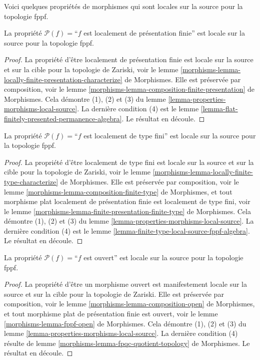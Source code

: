 \noindent
Voici quelques propriétés de morphismes qui sont locales sur la source pour la
topologie fppf.

\begin{lemma}
\label{lemma-locally-finite-presentation-fppf-local-source}
La propriété $\mathcal{P}(f)=$``$f$ est localement de présentation finie''
est locale sur la source pour la topologie fppf.
\end{lemma}

\begin{proof}
La propriété d'être localement de présentation finie est locale sur la source
et sur la cible pour la topologie de Zariski, voir le
lemme \ref{morphisms-lemma-locally-finite-presentation-characterize} de Morphismes.
Elle est préservée par composition, voir
le lemme \ref{morphisms-lemma-composition-finite-presentation} de Morphismes.
Cela démontre (1), (2) et (3) du
lemme \ref{lemma-properties-morphisms-local-source}.
La dernière condition (4) est le
lemme \ref{lemma-flat-finitely-presented-permanence-algebra}.
Le résultat en découle.
\end{proof}

\begin{lemma}
\label{lemma-locally-finite-type-fppf-local-source}
La propriété $\mathcal{P}(f)=$``$f$ est localement de type fini''
est locale sur la source pour la topologie fppf.
\end{lemma}

\begin{proof}
La propriété d'être localement de type fini est locale sur la source et sur la
cible pour la topologie de Zariski, voir le
lemme \ref{morphisms-lemma-locally-finite-type-characterize} de Morphismes.
Elle est préservée par composition, voir
le lemme \ref{morphisms-lemma-composition-finite-type} de Morphismes,
et tout morphisme plat localement de présentation finie est localement de type
fini, voir
le lemme \ref{morphisms-lemma-finite-presentation-finite-type} de Morphismes.
Cela démontre (1), (2) et (3) du
lemme \ref{lemma-properties-morphisms-local-source}.
La dernière condition (4) est le
lemme \ref{lemma-finite-type-local-source-fppf-algebra}.
Le résultat en découle.
\end{proof}

\begin{lemma}
\label{lemma-open-fppf-local-source}
La propriété $\mathcal{P}(f)=$``$f$ est ouvert''
est locale sur la source pour la topologie fppf.
\end{lemma}

\begin{proof}
La propriété d'être un morphisme ouvert est manifestement locale sur la source
et sur la cible pour la topologie de Zariski.
Elle est préservée par composition, voir
le lemme \ref{morphisms-lemma-composition-open} de Morphismes,
et tout morphisme plat de présentation finie est ouvert, voir
le lemme \ref{morphisms-lemma-fppf-open} de Morphismes.
Cela démontre (1), (2) et (3) du
lemme \ref{lemma-properties-morphisms-local-source}.
La dernière condition (4) résulte de
lemme \ref{morphisms-lemma-fpqc-quotient-topology} de Morphismes.
Le résultat en découle.
\end{proof}

